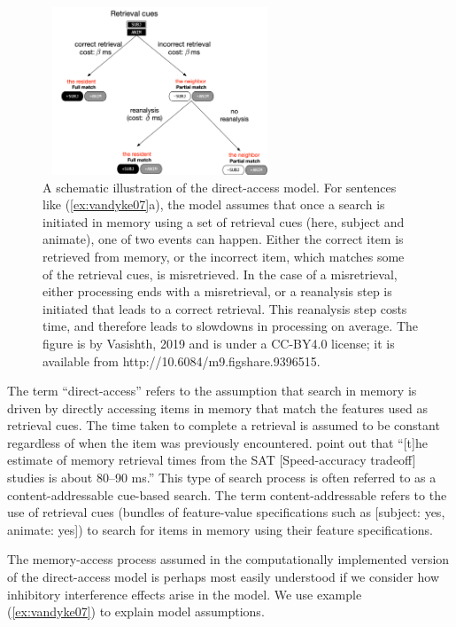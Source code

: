 \documentclass{cambridge7A}\usepackage[]{graphicx}\usepackage[]{color}
\begin{document}
\begin{figure}
\begin{center}
\includegraphics[height=5cm,width=7cm]{figures/c05DA.jpg}
\end{center}
\caption{A schematic illustration of the direct-access model. For sentences like (\ref{ex:vandyke07}a), the model assumes that once a search is initiated in memory using a set of retrieval cues (here, subject and animate), one of two events can happen. Either the correct item is retrieved from memory, or the incorrect item, which matches some of the retrieval cues, is misretrieved. In the case of a misretrieval, either processing ends with a misretrieval, or a reanalysis step is initiated that leads to a correct retrieval. This reanalysis step costs time, and therefore leads to slowdowns in processing on average. The figure is by Vasishth, 2019 and is under a CC-BY4.0 license; it is available from http://10.6084/m9.figshare.9396515.} \label{fig:da}
\end{figure}

The term ``direct-access'' refers to the assumption that search in memory is driven by directly accessing items in memory that match the features used as retrieval cues. The time taken to complete a retrieval is assumed to be constant regardless of when the item was previously encountered. \cite{LewisVasishthVanDyke2006} point out that  ``[t]he estimate of memory retrieval times from the SAT [Speed-accuracy tradeoff] studies is about 80–90 ms.'' This type of  search process is often referred to as a content-addressable cue-based search. The term content-addressable refers to the use of retrieval cues (bundles of feature-value specifications such as [subject: yes, animate: yes]) to search for items in memory using their feature specifications. 

The memory-access process assumed in the computationally implemented version of the direct-access model \citep{NicenboimRetrieval2018} is perhaps most easily understood if we consider how inhibitory interference effects arise in the model. We use example (\ref{ex:vandyke07}) to explain model assumptions.
\end{document}
